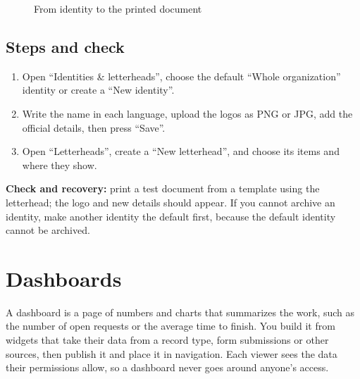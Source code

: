 \begin{figure}[H]
\centering
{}
\rclegend
\caption{From identity to the printed document}
\label{fig:builder-identities-model}
\end{figure}

\subsection{Steps and check}
\begin{enumerate}
\item Open “Identities \& letterheads”, choose the default “Whole organization” identity or create a “New identity”.
\item Write the name in each language, upload the logos as PNG or JPG, add the official details, then press “Save”.
\item Open “Letterheads”, create a “New letterhead”, and choose its items and where they show.
\end{enumerate}

\textbf{Check and recovery:} print a test document from a template using the letterhead; the logo and new details should appear. If you cannot archive an identity, make another identity the default first, because the default identity cannot be archived.

\clearpage
\section{Dashboards}
\label{sec:builder-feature-dashboards}

A dashboard is a page of numbers and charts that summarizes the work, such as the number of open requests or the average time to finish. You build it from widgets that take their data from a record type, form submissions or other sources, then publish it and place it in navigation. Each viewer sees the data their permissions allow, so a dashboard never goes around anyone's access.

